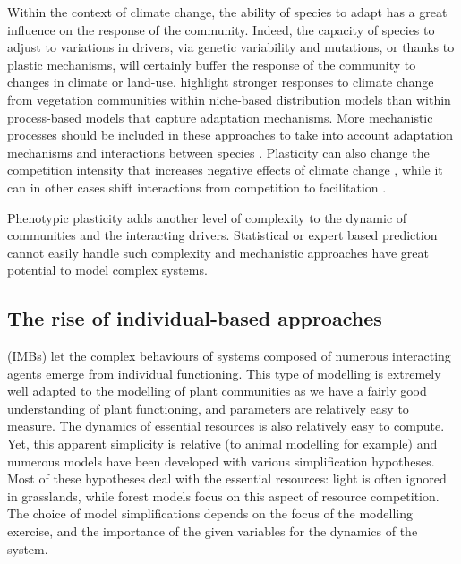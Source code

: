 Within the context of climate change, the ability of species to adapt has a great influence on the response of the community. Indeed, the capacity of species to adjust to variations in drivers, via genetic variability and mutations, or thanks to plastic mechanisms, will certainly buffer the response of the community to changes in climate or land-use. \citet{morin_comparing_2009} highlight stronger responses to climate change from vegetation communities within niche-based distribution models than within process-based models that capture adaptation mechanisms. More mechanistic processes should be included in these approaches \parencite{evans_towards_2016} to take into account adaptation mechanisms and interactions between species \parencite{gilman_framework_2010}. Plasticity can also change the competition intensity that increases negative effects of climate change  \parencite{hanel_phenotypic_2015}, while it can in other cases shift interactions from competition to facilitation  \parencite{callaway_phenotypic_2003}.

Phenotypic plasticity adds another level of complexity to the dynamic of communities and the interacting drivers. Statistical or expert based prediction cannot easily handle such complexity and mechanistic approaches have great potential to model complex systems.




\subsection{The rise of individual-based approaches}


 (IMBs) let the complex behaviours of systems composed of numerous interacting agents emerge from individual functioning. This type of modelling is extremely well adapted to the modelling of plant communities as we have a fairly good understanding of plant functioning, and parameters are relatively easy to measure. The dynamics of essential resources is also relatively easy to compute. Yet, this apparent simplicity is relative (to animal modelling for example) and numerous models have been developed with various simplification hypotheses. Most of these hypotheses deal with the essential resources: light is often ignored in grasslands, while forest models focus on this aspect of resource competition. The choice of model simplifications depends on the focus of the modelling exercise, and the importance of the given variables for the dynamics of the system.

